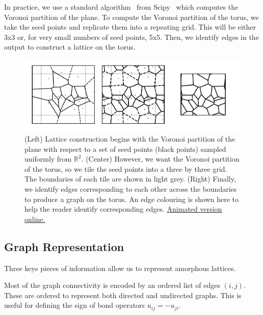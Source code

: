 In practice, we use a standard algorithm~\autocite{barberQuickhullAlgorithmConvex1996} from Scipy~\autocite{virtanenSciPyFundamentalAlgorithms2020} which computes the Voronoi partition of the plane. To compute the Voronoi partition of the torus, we take the seed points and replicate them into a repeating grid. This will be either 3x3 or, for very small numbers of seed points, 5x5. Then, we identify edges in the output to construct a lattice on the torus.

\hypertarget{fig:lattice_construction_animated}{%
\begin{figure}
\centering
\includegraphics[width=1\textwidth,height=\textheight]{figure_code/amk_chapter/lattice_construction_animated/lattice_construction_animated}
\caption[{Lattice Construction}]{(Left) Lattice construction begins with the Voronoi partition of the plane with respect to a set of seed points (black points) sampled uniformly from \(\mathbb{R}^2\). (Center) However, we want the Voronoi partition of the torus, so we tile the seed points into a three by three grid. The boundaries of each tile are shown in light grey. (Right) Finally, we identify edges corresponding to each other across the boundaries to produce a graph on the torus. An edge colouring is shown here to help the reader identify corresponding edges. \href{http://thomashodson.com/assets/thesis/figure_code/amk_chapter/lattice_construction_animated/lattice_construction_animated.gif}{ Animated version online.}}
\label{fig:lattice_construction_animated}
\end{figure}
}

\hypertarget{graph-representation}{%
\subsection{Graph Representation}\label{graph-representation}}

Three keys pieces of information allow us to represent amorphous lattices.

Most of the graph connectivity is encoded by an ordered list of edges \((i,j)\). These are ordered to represent both directed and undirected graphs. This is useful for defining the sign of bond operators \(u_{ij} = - u_{ji}\).

